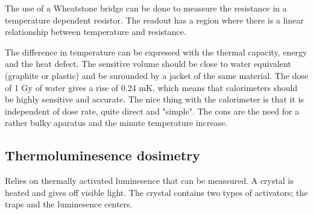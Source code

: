 \documentclass{article}
\begin{document}
The use of a Wheatstone bridge can be done to meassure the resistance in a temperature dependent resistor.
The readout has a region where there is a linear relationship between temperature and resistance.

The difference in temperature can be expressed with the thermal capacity, energy and the heat defect.
The sensitive volume should be close to water equivalent (graphite or plastic) and be surounded by a jacket of the same material.
The dose of 1 Gy of water gives a rise of 0.24 mK, which means that calorimeters should be highly sensitive and accurate.
	The nice thing with the calorimeter is that it is independent of dose rate, quite direct and "simple". 
The cons are the need for a rather bulky aparatus and the minute temperature increase.

\subsection{Thermoluminesence dosimetry}

Relies on thermally activated luminesence that can be meassured. 
A crystal is heated and gives off visible light.
The crystal contains two types of activators; the traps and the luminesence centers.
\end{document}
